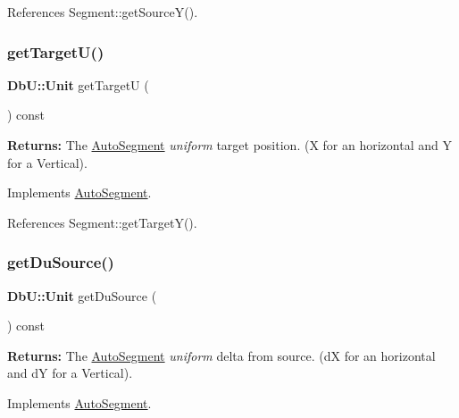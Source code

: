 References Segment\+::get\+Source\+Y().

\mbox{\label{classKatabatic_1_1AutoVertical_a4d52a506cd19dfa8e22e1dc0695bd960}} 
\subsubsection{\texorpdfstring{get\+Target\+U()}{getTargetU()}}
{\footnotesize\ttfamily \textbf{ Db\+U\+::\+Unit} get\+TargetU (\begin{DoxyParamCaption}{ }\end{DoxyParamCaption}) const\hspace{0.3cm}{\ttfamily [virtual]}}

{\bfseries Returns\+:} The \hyperlink{classKatabatic_1_1AutoSegment}{Auto\+Segment} {\itshape uniform} target position. (X for an horizontal and Y for a Vertical). 

Implements \hyperlink{classKatabatic_1_1AutoSegment_a828fef2716cc9c370d6d170bb96556ec}{Auto\+Segment}.



References Segment\+::get\+Target\+Y().

\mbox{\label{classKatabatic_1_1AutoVertical_a760500b1fd027c71f5362dd8c0b01ea7}} 
\subsubsection{\texorpdfstring{get\+Du\+Source()}{getDuSource()}}
{\footnotesize\ttfamily \textbf{ Db\+U\+::\+Unit} get\+Du\+Source (\begin{DoxyParamCaption}{ }\end{DoxyParamCaption}) const\hspace{0.3cm}{\ttfamily [virtual]}}

{\bfseries Returns\+:} The \hyperlink{classKatabatic_1_1AutoSegment}{Auto\+Segment} {\itshape uniform} delta from source. (dX for an horizontal and dY for a Vertical). 

Implements \hyperlink{classKatabatic_1_1AutoSegment_ab4881df67bd8f036d0199ed6540fe774}{Auto\+Segment}.



